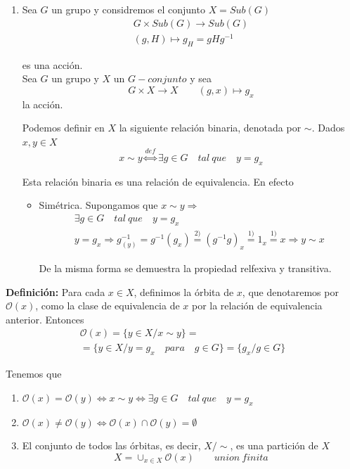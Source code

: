 \documentclass{article}
\begin{document}
\begin{enumerate}[1)]
\item Sea $G$ un grupo y considremos el conjunto $X=Sub(G)$
\begin{gather*}
G\times Sub(G)\longrightarrow Sub(G)\\
(g,H)\longmapsto g_H=gHg^{-1}
\end{gather*}

es una acción. \\

Sea $G$ un grupo y $X$ un $G-conjunto$ y sea 
\begin{equation*}
G\times X\longrightarrow X \qquad (g,x)\longmapsto g_x
\end{equation*}
la acción.

Podemos definir en $X$ la siguiente relación binaria, denotada por $\sim$. Dados $x,y\in X$
\begin{equation*}
x\sim y\overset{def}{\Leftrightarrow} \exists g\in G\quad tal\:que\quad y=g_x
\end{equation*}

Esta relación binaria es una relación de equivalencia. En efecto
\begin{itemize}
\item Simétrica. Supongamos que $x\sim y\Rightarrow$
\begin{gather*}
\exists g\in G\quad tal\:que\quad y=g_x \\
y=g_x\Rightarrow g^{-1}_{(y)}=g^{-1}(g_x)\overset{2)}{=}(g^{-1}g)_x\overset{1)}{=}1_x\overset{1)}{=}x\Rightarrow y\sim x
\end{gather*}

De la misma forma se demuestra la propiedad relfexiva y transitiva.
\end{itemize}

\end{enumerate}

\textbf{Definición:} Para cada $x\in X$, definimos la órbita de $x$, que denotaremos por $\mathcal{O}(x)$, como la clase de equivalencia de $x$ por la relación de equivalencia anterior. Entonces
\begin{gather*}
\mathcal{O}(x)=\{y\in X/x\sim y\}= \\
=\{y\in X/y=g_x\quad para\quad g\in G\}=\{g_x/g\in G\}
\end{gather*}

Tenemos que 
\begin{enumerate}[1)]
\item $\mathcal{O}(x)=\mathcal{O}(y)\Leftrightarrow x\sim y\Leftrightarrow \exists g\in G \quad tal\:que\quad y=g_x$

\item $\mathcal{O}(x)\neq \mathcal{O}(y)\Leftrightarrow \mathcal{O}(x)\cap \mathcal{O}(y)=\emptyset$

\item El conjunto de todos las órbitas, es decir, $X/\sim$, es una partición de $X$
\begin{equation*}
X=\cup_{x\in X} \mathcal{O}(x) \qquad union\:finita
\end{equation*}
\end{enumerate}
\end{document}
